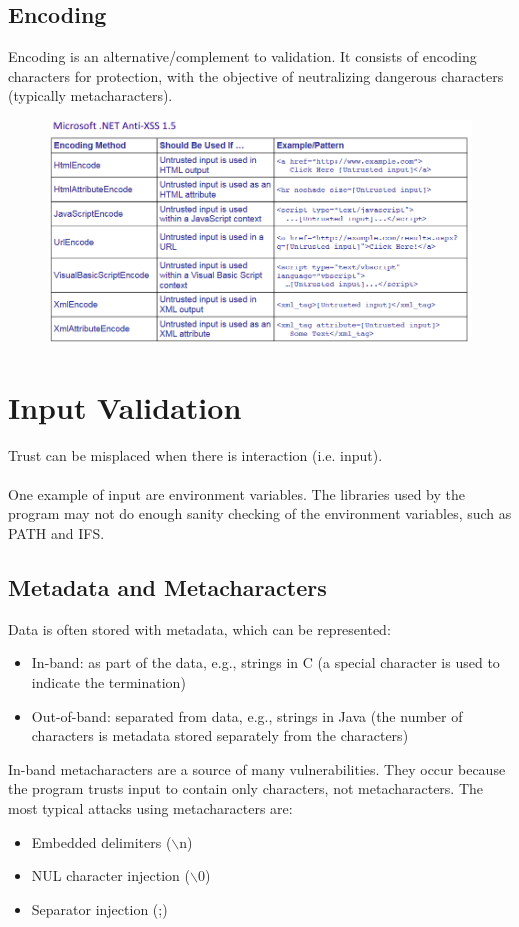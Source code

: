 \documentclass[10pt,a4paper]{report}
\begin{document}
\subsection{Encoding}
Encoding is an alternative/complement to validation. It consists of encoding characters for protection, with the objective of neutralizing dangerous characters (typically metacharacters).
\begin{figure}[H]
\centering
\includegraphics[scale=0.4]{12.png}
\end{figure}

\section{Input Validation}
Trust can be misplaced when there is interaction (i.e. input).\\
\\
One example of input are environment variables. The libraries used by the program may not do enough sanity checking of the environment variables, such as PATH and IFS.
\subsection{Metadata and Metacharacters}
Data is often stored with metadata, which can be represented:
\begin{itemize}
\item In-band: as part of the data, e.g., strings in C (a special character is used to indicate the termination)
\item Out-of-band: separated from data, e.g., strings in Java (the number of characters is metadata stored separately from the characters)
\end{itemize}
In-band metacharacters are a source of many vulnerabilities. They occur because the program trusts input to contain only characters, not metacharacters. The most typical attacks using metacharacters are:
\begin{itemize}
\item Embedded delimiters ($\backslash$n)
\item NUL character injection ($\backslash$0)
\item Separator injection (;)
\end{itemize}
\end{document}
